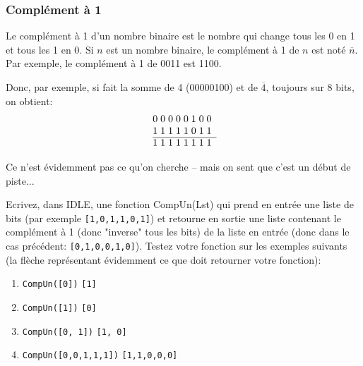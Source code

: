 \documentclass[12pt]{article}
\newenvironment{MaReponse}
		{\begin{greyedtextbox}\itshape} %
		{\end{greyedtextbox}}            %
\newenvironment{alphenum}
{\begin{enumerate}[label=\alph*.]}
	{\end{enumerate}}
\begin{document}
	\subsubsection*{Complément à 1}
	Le complément à 1 d'un nombre binaire est le nombre qui change tous les 0 en 1 et tous les 1 en 0.
	Si $n$ est un nombre binaire, le complément à 1 de $n$ est noté \textbf{$\overline{n}$}.
	Par exemple, le complément à 1 de 0011 est 1100.
	
	Donc, par exemple, si fait la somme de 4 (00000100) et de \textbf{$\overline{4}$}, toujours sur 8 bits, on obtient:
	\[
	\begin{array}{@{}r *{8}{@{\;}c}}
		& 0 & 0 & 0 & 0 & 0 & 1 & 0 & 0 \\
		& 1 & 1 & 1 & 1 & 1 & 0 & 1 & 1 \\
		\cline{2-9}
		& 1 & 1 & 1 & 1 & 1 & 1 & 1 & 1 \\
	\end{array}
	\]
	
	Ce n'est évidemment pas ce qu'on cherche -- mais on sent que c'est un début de piste...
	
	\begin{MonExo}
		Ecrivez, dans IDLE, une fonction CompUn(Lst) qui prend en entrée une liste de bits (par exemple \texttt{[1,0,1,1,0,1]}) et retourne en sortie une liste contenant le complément à 1 (donc "inverse" tous les bits) de la liste en entrée (donc dans le cas précédent: \texttt{[0,1,0,0,1,0]}). Testez votre fonction sur les exemples suivants (la flèche représentant évidemment ce que doit retourner votre fonction):
		\begin{alphenum}
			\item \texttt{CompUn([0])} \textrightarrow  \texttt{[1]}
			\item \texttt{CompUn([1])} \textrightarrow  \texttt{[0]}
			\item \texttt{CompUn([0, 1])} \textrightarrow  \texttt{[1, 0]}
			\item \texttt{CompUn([0,0,1,1,1])} \textrightarrow  \texttt{[1,1,0,0,0]}
		\end{alphenum}
	\end{MonExo}
	\begin{MaReponse}
	\end{MaReponse}
	
\end{document}
